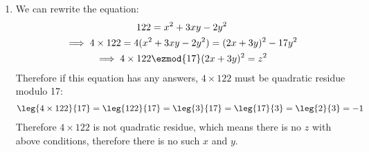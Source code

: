 \begin{enumerate}[label=]
   \item 
      We can rewrite the equation:
      \begin{gather*}
         122 = x^2 + 3xy - 2y^2 \\
         \implies 4 \times 122 = 4 (x^2 + 3xy - 2y^2) = (2x + 3y)^2 - 17y^2 \\
         \implies 4 \times 122 \ezmod{17} (2x + 3y)^2 = z^2
      \end{gather*}
      Therefore if this equation has any answers, $4 \times 122$ must be quadratic residue modulo 17:
      \begin{gather*}
         \leg{4 \times 122}{17} = \leg{122}{17} = \leg{3}{17} = \leg{17}{3} = \leg{2}{3} = -1
      \end{gather*}
      Therefore $4 \times 122$ is not quadratic residue, which means there is no $z$ with above conditions, therefore there is no such $x$ and $y$.
\end{enumerate}